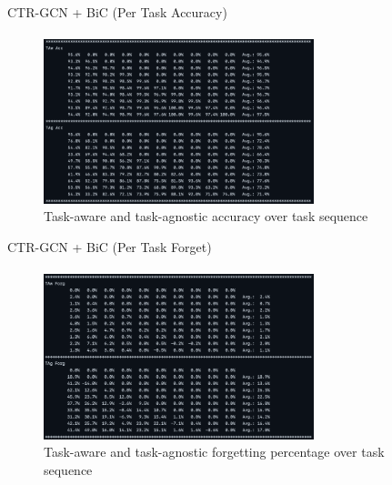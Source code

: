 \documentclass[aspectratio=169, xcolor=dvipsnames]{beamer}
\begin{document}
\begin{frame}{CTR-GCN + BiC (Per Task Accuracy)}
      \framesubtitle{}%
      
      \begin{figure}[ht!]
            \centering
            \includegraphics[width=0.7\textwidth]{images/per_task_acc}
            \caption{Task-aware and task-agnostic accuracy over task sequence}
      \end{figure}
\end{frame}

\begin{frame}{CTR-GCN + BiC (Per Task Forget)}
      \framesubtitle{}%
      
      \begin{figure}[ht!]
            \centering
            \includegraphics[width=0.7\textwidth]{images/per_task_forget}
            \caption{Task-aware and task-agnostic forgetting percentage over task sequence}
      \end{figure}
\end{frame}
\end{document}
